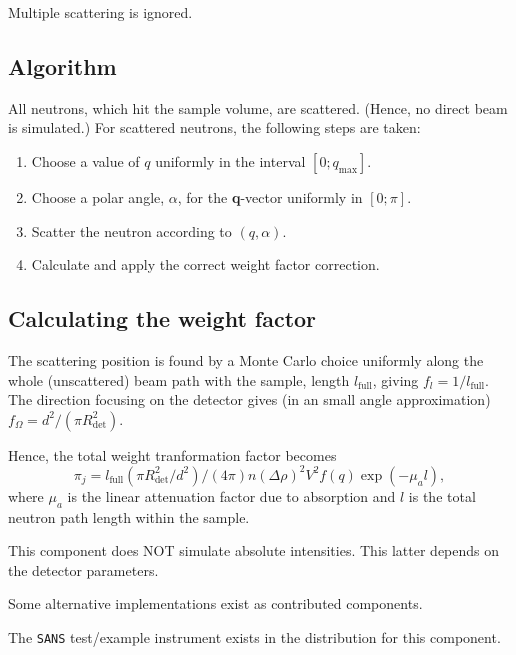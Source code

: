 Multiple scattering is ignored.

\subsection{Algorithm}
All neutrons, which hit the sample volume, are scattered.
(Hence, no direct beam is simulated.)
For scattered neutrons, the following steps are taken:
\begin{enumerate}
\item Choose a value of $q$ uniformly in the interval $[0;q_\textrm{max}]$.
\item Choose a polar angle, $\alpha$,
  for the \textbf{q}-vector uniformly in $[0;\pi]$.
\item Scatter the neutron according to $(q,\alpha)$.
\item Calculate and apply the correct weight factor correction.
\end{enumerate}

\subsection{Calculating the weight factor}
The scattering position is found by a Monte Carlo choice uniformly
along the whole (unscattered) beam path with the sample, length $l_\textrm{full}$, giving
$f_l = 1/l_\textrm{full}$. The direction focusing on the detector gives
(in an small angle approximation) $f_\Omega = d^2 / (\pi R_\textrm{det}^2)$.

Hence, the total weight tranformation factor becomes %
\begin{equation}
\pi_j = l_\textrm{full} (\pi R_\textrm{det}^2 / d^2)/(4 \pi)
  n (\Delta\rho)^2 V^2 f(q) \exp(-\mu_a l) ,
\end{equation}
where $\mu_a$ is the linear attenuation factor due to absorption
and $l$ is the total neutron path length within the sample.

This component does NOT simulate absolute intensities. This latter depends on the detector parameters. 

Some alternative implementations exist as contributed components.

The \verb+SANS+ test/example instrument exists in the distribution for this component.
